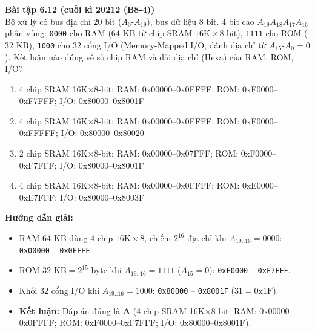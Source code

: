 \textbf{Bài tập 6.12 (cuối kì 20212 (B8-4))}\\
Bộ xử lý có bus địa chỉ $20\text{ bit}$ ($A_0\text{-}A_{19}$), bus dữ liệu $8\text{ bit}$. $4$ bit cao $A_{19}A_{18}A_{17}A_{16}$ phân vùng: \texttt{0000} cho RAM ($64\text{ KB}$ từ chip SRAM $16\text{K}\times 8\text{-bit}$), \texttt{1111} cho ROM ($32\text{ KB}$), \texttt{1000} cho $32$ cổng I/O (Memory-Mapped I/O, đánh địa chỉ từ $A_{15}\text{-}A_0 = 0$). Kết luận nào đúng về số chip RAM và dải địa chỉ (Hexa) của RAM, ROM, I/O?
\begin{enumerate}[label=\Alph*.]
    \item 4 chip SRAM 16K$\times$8-bit; RAM: 0x00000--0x0FFFF; ROM: 0xF0000--0xF7FFF; I/O: 0x80000--0x8001F
    \item 4 chip SRAM 16K$\times$8-bit; RAM: 0x00000--0x0FFFF; ROM: 0xF0000--0xFFFFF; I/O: 0x80000--0x80020
    \item 2 chip SRAM 16K$\times$8-bit; RAM: 0x00000--0x07FFF; ROM: 0xF0000--0xF7FFF; I/O: 0x80000--0x8001F
    \item 4 chip SRAM 16K$\times$8-bit; RAM: 0x00000--0x0FFFF; ROM: 0xE0000--0xE7FFF; I/O: 0x80000--0x8003F
\end{enumerate}
\textbf{Hướng dẫn giải:}
\begin{itemize}
    \item RAM $64\text{ KB}$ dùng $4$ chip $16\text{K}\times 8$, chiếm $2^{16}$ địa chỉ khi $A_{19..16} = 0000$: \texttt{0x00000} -- \texttt{0x0FFFF}.
    \item ROM $32\text{ KB} = 2^{15}$ byte khi $A_{19..16} = 1111$ ($A_{15}=0$): \texttt{0xF0000} -- \texttt{0xF7FFF}.
    \item Khối $32$ cổng I/O khi $A_{19..16} = 1000$: \texttt{0x80000} -- \texttt{0x8001F} ($31 = \text{0x1F}$).
    \item \textbf{Kết luận:} Đáp án đúng là \textbf{A} (4 chip SRAM 16K$\times$8-bit; RAM: 0x00000--0x0FFFF; ROM: 0xF0000--0xF7FFF; I/O: 0x80000--0x8001F).
\end{itemize}

